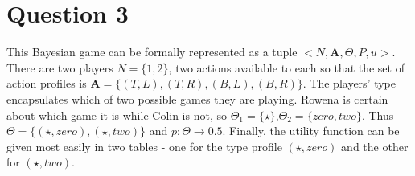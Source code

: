 \documentclass[10pt,a4paper]{article}
\begin{document}
\section*{Question 3}
This Bayesian game can be formally represented as a tuple $<N,\boldsymbol{A}, \Theta, P, u>$. There are two players $N=\{1,2\}$, two actions available to each so that the set of action profiles is $\boldsymbol{A}=\{(T,L),(T,R),(B,L),(B,R)\}$. The players' type encapsulates which of two possible games they are playing. Rowena is certain about which game it is while Colin is not, so $\Theta_1=\{\star\}$,$\Theta_2=\{zero,two\}$. Thus $\Theta=\{(\star,zero),(\star,two)\}$ and $p: \Theta \rightarrow 0.5$. Finally, the utility function can be given most easily in two tables - one for the type profile $(\star,zero)$ and the other for $(\star,two)$.







 
\end{document}
